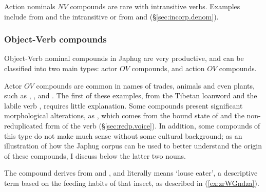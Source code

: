 Action nominals $NV$ compounds are rare with intransitive verbs. Examples include  from  and the intransitive  or  from  and  (§\ref{sec:incorp.denom}).


\subsubsection{Object-Verb compounds} \label{sec:object.verb.compounds}
Object-Verb nominal compounds in Japhug are very productive, and can be classified into two main types: actor $OV$ compounds, and action $OV$ compounds.

Actor $OV$ compounds are common in names of trades, animals and even plants, such as , ,  and . The first of these examples, from the Tibetan loanword  and the labile verb , requires little explanation. Some compounds present significant morphological alterations, as , which comes from the bound state of  and the non-reduplicated form of the verb  (§\ref{sec:redp.voice}). In addition, some compounds of this type do not make much sense without some cultural background; as an illustration of how the Japhug corpus can be used to better understand the origin of these compounds, I discuss below the latter two nouns.

The compound  derives from  and , and literally means `louse eater', a descriptive term based on the feeding habits of that insect, as described in (\ref{ex:zrWGndza}).

